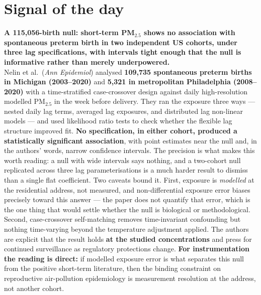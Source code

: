 \documentclass[10pt]{article}
\begin{document}
\vspace{6mm}

\section*{\sffamily\bfseries\color{Deep}Signal of the day}
\vspace{-1.5mm}{\color{Amber}\rule{\linewidth}{1.1pt}}\vspace{2.5mm}

\begin{keybox}
{\sffamily\bfseries\small\color{Deep}A 115{,}056-birth null: short-term PM$_{2.5}$ shows
no association with spontaneous preterm birth in two independent US cohorts, under three
lag specifications, with intervals tight enough that the null is informative rather than
merely underpowered.}\\[1.4mm]
\footnotesize
Nelin et al.\ (\textit{Ann Epidemiol}) analysed \textbf{109{,}735 spontaneous preterm
births in Michigan (2003--2020)} and \textbf{5{,}321 in metropolitan Philadelphia
(2008--2020)} with a time-stratified case-crossover design against daily high-resolution
modelled PM$_{2.5}$ in the week before delivery. They ran the exposure three ways ---
nested daily lag terms, averaged lag exposures, and distributed lag non-linear models ---
and used likelihood ratio tests to check whether the flexible lag structure improved fit.
\textbf{No specification, in either cohort, produced a statistically significant
association}, with point estimates near the null and, in the authors' words, narrow
confidence intervals. The precision is what makes this worth reading: a null with wide
intervals says nothing, and a two-cohort null replicated across three lag
parameterisations is a much harder result to dismiss than a single flat coefficient.
Two caveats bound it. First, exposure is \emph{modelled} at the residential address, not
measured, and non-differential exposure error biases precisely toward this answer --- the
paper does not quantify that error, which is the one thing that would settle whether the
null is biological or methodological. Second, case-crossover self-matching removes
time-invariant confounding but nothing time-varying beyond the temperature adjustment
applied. The authors are explicit that the result holds \textbf{at the studied
concentrations} and press for continued surveillance as regulatory protections change.
\textbf{For instrumentation the reading is direct:} if modelled exposure error is what
separates this null from the positive short-term literature, then the binding constraint
on reproductive air-pollution epidemiology is measurement resolution at the address, not
another cohort.
\end{keybox}
\end{document}
